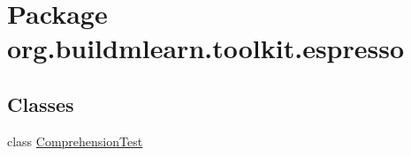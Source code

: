\hypertarget{namespaceorg_1_1buildmlearn_1_1toolkit_1_1espresso}{}\section{Package org.\+buildmlearn.\+toolkit.\+espresso}
\label{namespaceorg_1_1buildmlearn_1_1toolkit_1_1espresso}
\subsection*{Classes}
\begin{DoxyCompactItemize}
\item 
class \hyperlink{classorg_1_1buildmlearn_1_1toolkit_1_1espresso_1_1ComprehensionTest}{Comprehension\+Test}
\end{DoxyCompactItemize}
